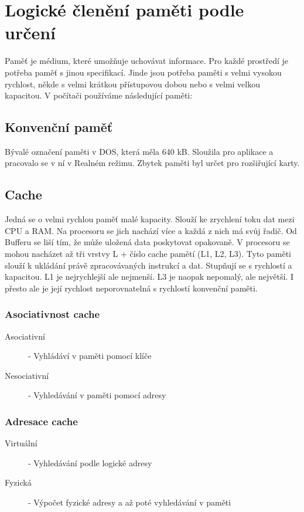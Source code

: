 \section{Logické členění paměti podle určení}
\label{sec:logicke-cleneni-pameti}
Paměť je médium, které umožňuje uchovávat informace.
Pro každé prostředí je potřeba paměť s jinou specifikací.
Jinde jsou potřeba paměti s velmi vysokou rychlost, někde s velmi krátkou přístupovou dobou nebo s velmi velkou kapacitou.
V počítači používáme následující paměti:
\subsection{Konvenční paměť}
Bývalé označení paměti v DOS, která měla 640 kB.
Sloužila pro aplikace a pracovalo se v ní v Realném režimu.
Zbytek paměti byl určet pro rozšiřující karty.
\subsection{Cache}
Jedná se o velmi rychlou paměť malé kapacity.
Slouží ke zrychlení toku dat mezi CPU a RAM.
Na procesoru se jich nachází více a každá z nich má svůj řadič.
Od Bufferu se liší tím, že může uložená data poskytovat opakovaně.
V procesoru se mohou nacházet až tři vrstvy L + číslo cache pamětí (L1, L2, L3).
Tyto paměti slouží k ukládání právě zpracovávaných instrukcí a dat.
Stupňují se s rychlostí a kapacitou.
L1 je nejrychlejší ale nejmenší.
L3 je naopak nepomalý, ale největší. 
I přesto ale je její rychlost neporovnatelná s rychlostí konvenční paměti.
\subsubsection{Asociativnost cache}
\begin{description}
  \item[Asociativní]- Vyhládáví v paměti pomocí klíče
  \item[Nesociativní]-  Vyhledávání v paměti pomocí adresy
\end{description}
\subsubsection{Adresace cache}
\begin{description}
  \item[Virtuální]- Vyhledávání podle logické adresy
  \item[Fyzická]- Výpočet fyzické adresy a až poté vyhledávání v paměti
\end{description}
